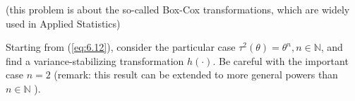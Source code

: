 \begin{ex}
    (this problem is about the so-called Box-Cox transformations, which are widely used in Applied Statistics) 
    
    Starting from (\ref{eq:6.12}), consider the particular case \(\tau^{2}(\theta)=\theta^{n}, n \in \mathbb{N}\), and find a variance-stabilizing transformation \(h(\cdot)\). Be careful with the important case \(n=2\) (remark: this result can be extended to more general powers than \(n \in \mathbb{N}\) ).
\end{ex}



